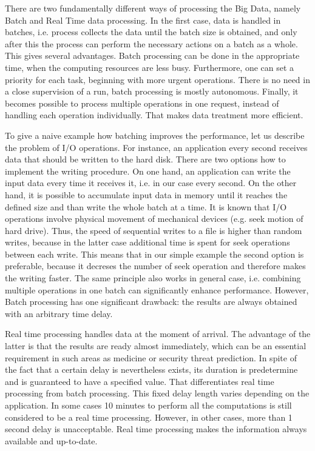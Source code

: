 There are two fundamentally different ways of processing the Big Data, namely Batch and Real Time data processing.
In the first case, data is handled in batches, i.e. process collects the data until the batch size is obtained, and only after this the process can perform the necessary actions on a batch as a whole.
This gives several advantages.
Batch processing can be done in the appropriate time, when the computing resources are less busy.
Furthermore, one can set a priority for each task, beginning with more urgent operations.
There is no need in a close supervision of a run, batch processing is mostly autonomous.
Finally, it becomes possible to process multiple operations in one request, instead of handling each operation individually.
That makes data treatment more efficient. 

To give a naive example how batching improves the performance, let us describe the problem of I/O operations.
For instance, an application every second receives data that should be written to the hard disk. 
There are two options how to implement the writing procedure.
On one hand, an application can write the input data every time it receives it, i.e. in our case every second.
On the other hand, it is possible to accumulate input data in memory until it reaches the defined size and than write the whole batch at a time.
It is known that I/O operations involve physical movement of mechanical devices (e.g. seek motion of hard drive).
Thus, the speed of sequential writes to a file is higher than random writes, because in the latter case additional time is spent for seek operations between each write.
This means that in our simple example the second option is preferable, because it decreses the number of seek operation and therefore makes the writing faster.    
The same principle also works in general case, i.e. combining multiple operations in one batch can significantly enhance performance.
However, Batch processing has one significant drawback: the results are always obtained with an arbitrary time delay.

Real time processing handles data at the moment of arrival. 
The advantage of the latter is that the results are ready almost immediately, which can be an essential requirement in such areas as medicine or security threat prediction. 
In spite of the fact that a certain delay is nevertheless exists, its duration is predetermine and is guaranteed to have a specified value.
That differentiates real time processing from batch processing.
This fixed delay length varies depending on the application.
In some cases 10 minutes to perform all the computations is still considered to be a real time processing.
However, in other cases, more than 1 second delay is unacceptable.
Real time processing makes the information always available and up-to-date.

